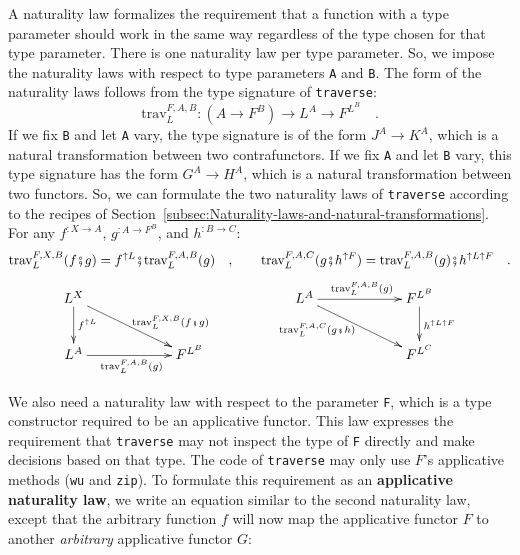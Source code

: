 A naturality law formalizes the requirement that a function with a
type parameter should work in the same way regardless of the type
chosen for that type parameter. There is one naturality law per type
parameter. So, we impose the naturality laws with respect to type
parameters \lstinline!A! and \lstinline!B!. The form of the naturality
laws follows from the type signature of \lstinline!traverse!:
\[
\text{trav}_{L}^{F,A,B}:(A\rightarrow F^{B})\rightarrow L^{A}\rightarrow F^{L^{B}}\quad.
\]
If we fix \lstinline!B! and let \lstinline!A! vary, the type signature
is of the form $J^{A}\rightarrow K^{A}$, which is a natural transformation
between two contrafunctors. If we fix \lstinline!A! and let \lstinline!B!
vary, this type signature has the form $G^{A}\rightarrow H^{A}$,
which is a natural transformation between two functors. So, we can
formulate the two naturality
laws of \lstinline!traverse! according to the recipes of Section~\ref{subsec:Naturality-laws-and-natural-transformations}.
For any $f^{:X\rightarrow A}$, $g^{:A\rightarrow F^{B}}$, and $h^{:B\rightarrow C}$:
\begin{equation}
\text{trav}_{L}^{F,X,B}(f\bef g)=f^{\uparrow L}\bef\text{trav}_{L}^{F,A,B}(g)\quad,\quad\quad\text{trav}_{L}^{F,A,C}(g\bef h^{\uparrow F})=\text{trav}_{L}^{F,A,B}(g)\bef h^{\uparrow L\uparrow F}\quad.\label{eq:naturality-laws-of-traverse}
\end{equation}
\vspace{-1.2\baselineskip}
\[
\xymatrix{\xyScaleY{2.0pc}\xyScaleX{5.0pc}L^{X}\ar[rd]\sp(0.6){~~\text{trav}_{L}^{F,X,B}(f\bef g)}\ar[d]\sp(0.45){f^{\uparrow L}} &  & L^{A}\ar[rd]\sb(0.35){\text{trav}_{L}^{F,A,C}(g\bef h)~~}\ar[r]\sp(0.5){\text{trav}_{L}^{F,A,B}(g)} & F^{L^{B}}\ar[d]\sp(0.45){h^{\uparrow L\uparrow F}}\\
L^{A}\ar[r]\sb(0.5){\text{trav}_{L}^{F,A,B}(g)} & F^{L^{B}} &  & F^{L^{C}}
}
\]

We also need a naturality law with respect to the parameter \lstinline!F!,
which is a type constructor required to be an applicative functor.
This law expresses the requirement that \lstinline!traverse! may
not inspect the type of \lstinline!F! directly and make decisions
based on that type. The code of \lstinline!traverse! may only use
$F$\textsf{'}s applicative methods (\lstinline!wu! and \lstinline!zip!).
To formulate this requirement as an \textbf{applicative naturality
law},
we write an equation similar to the second naturality law, except
that the arbitrary function $f$ will now map the applicative functor
$F$ to another \emph{arbitrary} applicative functor $G$:

